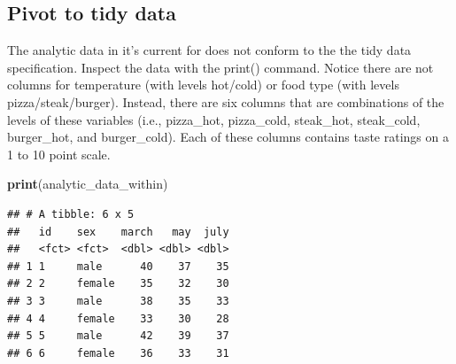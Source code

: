 \documentclass[
]{krantz}
\makeatletter
\newenvironment{Shaded}{\begin{snugshade}}{\end{snugshade}}
\newcommand{\CommentTok}[1]{\textcolor[rgb]{0.37,0.37,0.37}{\textit{#1}}}
\newcommand{\DataTypeTok}[1]{\textcolor[rgb]{0.27,0.27,0.27}{#1}}
\newcommand{\DecValTok}[1]{\textcolor[rgb]{0.06,0.06,0.06}{#1}}
\newcommand{\KeywordTok}[1]{\textcolor[rgb]{0.27,0.27,0.27}{\textbf{#1}}}
\newcommand{\NormalTok}[1]{#1}
\newcommand{\OperatorTok}[1]{\textcolor[rgb]{0.43,0.43,0.43}{\textbf{#1}}}
\newcommand{\OtherTok}[1]{\textcolor[rgb]{0.37,0.37,0.37}{#1}}
\newcommand{\StringTok}[1]{\textcolor[rgb]{0.5,0.5,0.5}{#1}}
\newenvironment{kframe}{%
\medskip{}
\setlength{\fboxsep}{.8em}
 \def\at@end@of@kframe{}%
 \ifinner\ifhmode%
  \def\at@end@of@kframe{\end{minipage}}%
  \begin{minipage}{\columnwidth}%
 \fi\fi%
 \def\FrameCommand##1{\hskip\@totalleftmargin \hskip-\fboxsep
 \colorbox{shadecolor}{##1}\hskip-\fboxsep
     \hskip-\linewidth \hskip-\@totalleftmargin \hskip\columnwidth}%
 \MakeFramed {\advance\hsize-\width
   \@totalleftmargin\z@ \linewidth\hsize
   \@setminipage}}%
 {\par\unskip\endMakeFramed%
 \at@end@of@kframe}
\renewenvironment{Shaded}{\begin{kframe}}{\end{kframe}}
\makeatother
\begin{document}
\begin{Shaded}
\end{Shaded}

\hypertarget{pivot-to-tidy-data-1}{%
\subsection{Pivot to tidy data}\label{pivot-to-tidy-data-1}}

The analytic data in it's current for does not conform to the the tidy data specification. Inspect the data with the print() command. Notice there are not columns for temperature (with levels hot/cold) or food type (with levels pizza/steak/burger). Instead, there are six columns that are combinations of the levels of these variables (i.e., pizza\_hot, pizza\_cold, steak\_hot, steak\_cold, burger\_hot, and burger\_cold). Each of these columns contains taste ratings on a 1 to 10 point scale.

\begin{Shaded}
\begin{Highlighting}[]
\KeywordTok{print}\NormalTok{(analytic_data_within)}
\end{Highlighting}
\end{Shaded}

\begin{verbatim}
## # A tibble: 6 x 5
##   id    sex    march   may  july
##   <fct> <fct>  <dbl> <dbl> <dbl>
## 1 1     male      40    37    35
## 2 2     female    35    32    30
## 3 3     male      38    35    33
## 4 4     female    33    30    28
## 5 5     male      42    39    37
## 6 6     female    36    33    31
\end{verbatim}
\end{document}
